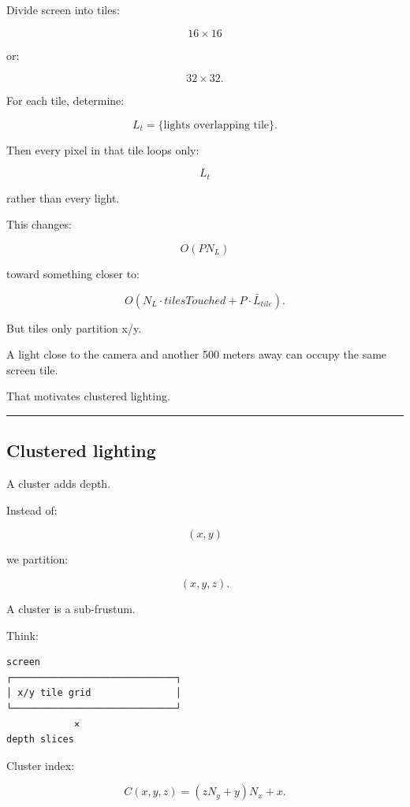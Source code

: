 \hypertarget{04-visual-computing-ii-ch040-tiled-lighting}{}

Divide screen into tiles:

\[
16\times16
\]

or:

\[
32\times32.
\]

For each tile, determine:

\[
L_t=
\{\text{lights overlapping tile}\}.
\]

Then every pixel in that tile loops only:

\[
L_t
\]

rather than every light.

This changes:

\[
O(PN_L)
\]

toward something closer to:

\[
O(
N_L\cdot tilesTouched
+
P\cdot \bar L_{tile}
).
\]

But tiles only partition x/y.

A light close to the camera and another 500 meters away can occupy the same screen tile.

That motivates clustered lighting.

\begin{center}\rule{0.5\linewidth}{0.5pt}\end{center}

\subsection{Clustered lighting}\label{04-visual-computing-ii-ch040-clustered-lighting}

\hypertarget{04-visual-computing-ii-ch040-clustered-lighting}{}

A cluster adds depth.

Instead of:

\[
(x,y)
\]

we partition:

\[
(x,y,z).
\]

A cluster is a sub-frustum.

Think:

\begin{verbatim}
screen
┌─────────────────────────────┐
│ x/y tile grid               │
└─────────────────────────────┘
            ×
depth slices
\end{verbatim}

Cluster index:

\[
\boxed{
C(x,y,z)
=
(zN_y+y)N_x+x.
}
\]

